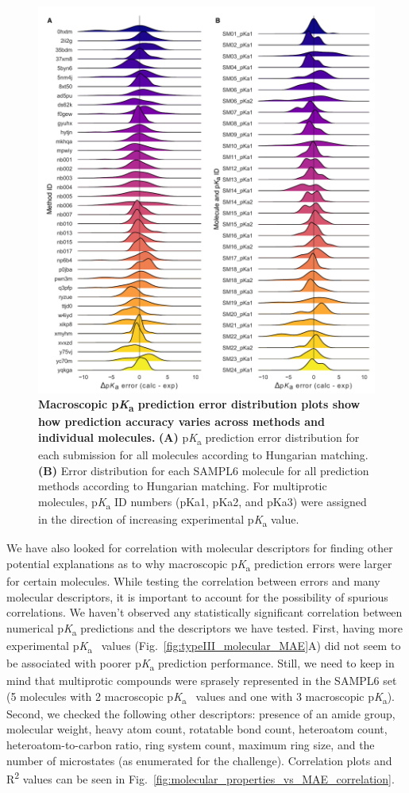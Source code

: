 \documentclass[9pt,lineno,final]{elife}
\newcommand{\pKa}{p\textit{K}\textsubscript{a}}
\begin{document}
\begin{figure}
\centering
\includegraphics[width=0.8\linewidth]{figures/typeIII-error-distribution.pdf}
\caption{{\bf Macroscopic \pKa{} prediction error distribution plots show how prediction accuracy varies across methods and individual molecules.}
{\bf(A)} \pKa{} prediction error distribution for each submission for all molecules according to Hungarian matching. 
{\bf(B)} Error distribution for each SAMPL6 molecule for all prediction methods according to Hungarian matching. For multiprotic molecules, \pKa{} ID numbers (pKa1, pKa2, and pKa3) were assigned in the direction of increasing experimental \pKa{} value. 
}
\label{fig:typeIII-error-distribution}
\end{figure}

We have also looked for correlation with molecular descriptors for finding other potential explanations as to why macroscopic \pKa{} prediction errors were larger for certain molecules. 
While testing the correlation between errors and many molecular descriptors, it is important to account for the possibility of spurious correlations. 
We haven't observed any statistically significant correlation between numerical \pKa{} predictions and the descriptors we have tested. 
First, having more experimental \pKa{}~ values (Fig.~\ref{fig:typeIII_molecular_MAE}A) did not seem to be associated with poorer \pKa{} prediction performance. 
Still, we need to keep in mind that multiprotic compounds were sprasely represented in the SAMPL6 set (5 molecules with 2 macroscopic \pKa{}~ values and one with 3 macroscopic \pKa{}).
Second, we checked the following other descriptors: presence of an amide group, molecular weight, heavy atom count, rotatable bond count, heteroatom count, heteroatom-to-carbon ratio, ring system count, maximum ring size, and the number of microstates (as enumerated for the challenge). 
Correlation plots and R\textsuperscript{2} values can be seen in Fig.~\ref{fig:molecular_properties_vs_MAE_correlation}. 
\end{document}
